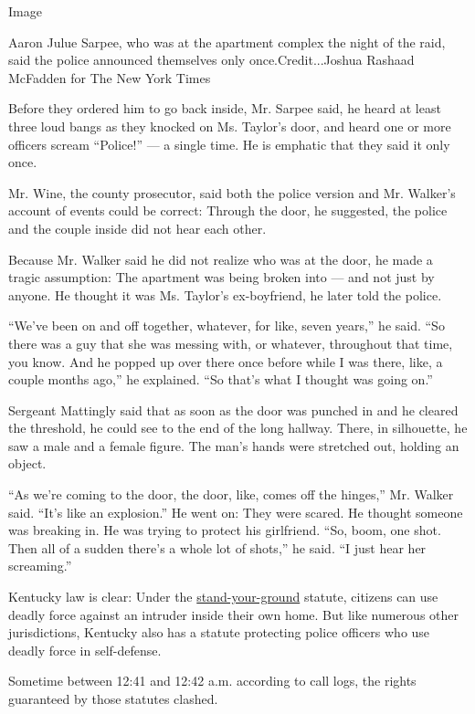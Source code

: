 Image

Aaron Julue Sarpee, who was at the apartment complex the night of the
raid, said the police announced themselves only once.Credit...Joshua
Rashaad McFadden for The New York Times

Before they ordered him to go back inside, Mr. Sarpee said, he heard at
least three loud bangs as they knocked on Ms. Taylor's door, and heard
one or more officers scream ``Police!'' --- a single time. He is
emphatic that they said it only once.

Mr. Wine, the county prosecutor, said both the police version and Mr.
Walker's account of events could be correct: Through the door, he
suggested, the police and the couple inside did not hear each other.

Because Mr. Walker said he did not realize who was at the door, he made
a tragic assumption: The apartment was being broken into --- and not
just by anyone. He thought it was Ms. Taylor's ex-boyfriend, he later
told the police.

``We've been on and off together, whatever, for like, seven years,'' he
said. ``So there was a guy that she was messing with, or whatever,
throughout that time, you know. And he popped up over there once before
while I was there, like, a couple months ago,'' he explained. ``So
that's what I thought was going on.''

Sergeant Mattingly said that as soon as the door was punched in and he
cleared the threshold, he could see to the end of the long hallway.
There, in silhouette, he saw a male and a female figure. The man's hands
were stretched out, holding an object.

``As we're coming to the door, the door, like, comes off the hinges,''
Mr. Walker said. ``It's like an explosion.'' He went on: They were
scared. He thought someone was breaking in. He was trying to protect his
girlfriend. ``So, boom, one shot. Then all of a sudden there's a whole
lot of shots,'' he said. ``I just hear her screaming.''

Kentucky law is clear: Under the
\href{https://www.ncsl.org/research/civil-and-criminal-justice/self-defense-and-stand-your-ground.aspx}{stand-your-ground}
statute, citizens can use deadly force against an intruder inside their
own home. But like numerous other jurisdictions, Kentucky also has a
statute protecting police officers who use deadly force in self-defense.

Sometime between 12:41 and 12:42 a.m. according to call logs, the rights
guaranteed by those statutes clashed.


